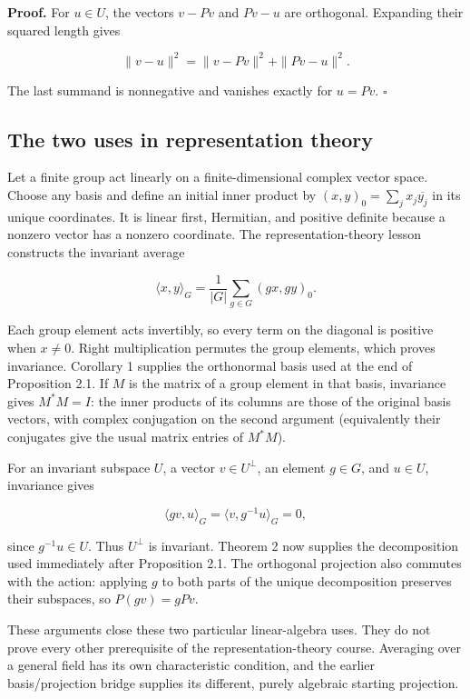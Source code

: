 \documentclass[
  english,
]{article}
\begin{document}
\textbf{Proof.} For \(u\in U\), the vectors \(v-Pv\) and \(Pv-u\) are
orthogonal. Expanding their squared length gives

\[
\|v-u\|^2=\|v-Pv\|^2+\|Pv-u\|^2.
\]

The last summand is nonnegative and vanishes exactly for \(u=Pv\).
\(\square\)

\subsection{The two uses in representation
theory}\label{the-two-uses-in-representation-theory}

Let a finite group act linearly on a finite-dimensional complex vector
space. Choose any basis and define an initial inner product by
\((x,y)_0=\sum_j x_j\overline{y_j}\) in its unique coordinates. It is
linear first, Hermitian, and positive definite because a nonzero vector
has a nonzero coordinate. The representation-theory lesson constructs
the invariant average

\[
\langle x,y\rangle_G=\frac1{|G|}\sum_{g\in G}(gx,gy)_0.
\]

Each group element acts invertibly, so every term on the diagonal is
positive when \(x\ne0\). Right multiplication permutes the group
elements, which proves invariance. Corollary 1 supplies the orthonormal
basis used at the end of Proposition 2.1. If \(M\) is the matrix of a
group element in that basis, invariance gives \(M^*M=I\): the inner
products of its columns are those of the original basis vectors, with
complex conjugation on the second argument (equivalently their
conjugates give the usual matrix entries of \(M^*M\)).

For an invariant subspace \(U\), a vector \(v\in U^\perp\), an element
\(g\in G\), and \(u\in U\), invariance gives

\[
\langle gv,u\rangle_G=\langle v,g^{-1}u\rangle_G=0,
\]

since \(g^{-1}u\in U\). Thus \(U^\perp\) is invariant. Theorem 2 now
supplies the decomposition used immediately after Proposition 2.1. The
orthogonal projection also commutes with the action: applying \(g\) to
both parts of the unique decomposition preserves their subspaces, so
\(P(gv)=gPv\).

These arguments close these two particular linear-algebra uses. They do
not prove every other prerequisite of the representation-theory course.
Averaging over a general field has its own characteristic condition, and
the earlier basis/projection bridge supplies its different, purely
algebraic starting projection.
\end{document}

